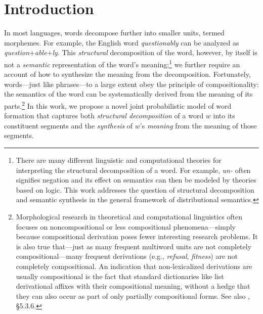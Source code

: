 \documentclass[11pt,letterpaper]{article}
\newcommand{\word}[1]{{\em #1}}
\begin{document}
\section{Introduction}
In most languages, words decompose further into smaller units, termed
morphemes. For example, the English word \word{questionably} can be
analyzed as \word{question}$+$\word{able}$+$\word{ly}. This {\em
  structural} decomposition of the word, however, by itself is not a
\emph{semantic} representation of the word's
meaning;\footnote{There are many different linguistic and
  computational theories for interpreting the structural
  decomposition of a word. For example, \word{un-} often
  signifies negation and its effect on semantics can then be
  modeled by theories based on logic. This work addresses
  the question of structural decomposition and semantic
  synthesis in the general framework of
  distributional semantics.}
we further
require an account of how to synthesize the meaning from the
decomposition. Fortunately, words---just like phrases---to a large extent
obey the principle of compositionality: the semantics of the word can
be systematically derived from the meaning of its
parts.\footnote{Morphological research in theoretical and
  computational linguistics often focuses on 
  noncompositional or less compositional phenomena---simply
  because compositional derivation poses fewer interesting
  research problems. It is also true that---just as many
  frequent multiword units are not completely compositional---many frequent derivations (e.g., \word{refusal},
  \word{fitness})
are not completely compositional. An indication 
that non-lexicalized derivations are usually compositional is
the fact that standard dictionaries like  list derivational affixes with
their compositional meaning, without a hedge that they can also
occur as part of
only partially compositional forms.
See also , \S 5.3.6.}
In this work,
we propose a novel joint probabilistic model of word formation that
captures both \emph{structural decomposition} of a word $w$
into its constituent
segments and 
the \emph{synthesis} of $w$'s \emph{meaning} from the meaning of those segments.
\end{document}
